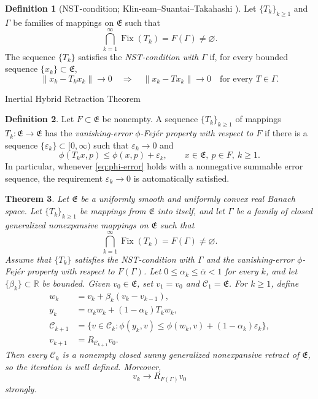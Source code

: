 \documentclass[leqno,12pt]{amsart}
\makeatletter
\def\R{\mathbb{R}}
\newtheorem{theorem}{Theorem}[section]
\theoremstyle{definition}
\newtheorem{definition}[theorem]{Definition}
\theoremstyle{remark}
\numberwithin{equation}{section}
\newcommand{\E}{\mathfrak{E}}
\newcommand{\C}{\mathscr{C}}
\newcommand{\Fix}{\operatorname{Fix}}
\def\section{\@startsection{section}{1}%
  \z@{.7\linespacing\@plus\linespacing}{.5\linespacing}%
  {\normalfont\bfseries\centering}}
\makeatother
\begin{document}
\begin{definition}[NST-condition; Klin-eam--Suantai--Takahashi \cite{KlineamSuantaiTakahashi2012}]\label{def:nst}
Let $\{T_k\}_{k\geq1}$ and $\Gamma$ be families of mappings on $\E$ such that
\[
 \bigcap_{k=1}^{\infty}\Fix(T_k)=F(\Gamma)\neq\varnothing.
\]
The sequence $\{T_k\}$ satisfies the \emph{NST-condition with $\Gamma$} if, for every bounded sequence $\{x_k\}\subset\E$,
\[
 \|x_k-T_kx_k\|\to0
 \quad\Longrightarrow\quad
 \|x_k-Tx_k\|\to0
 \quad\text{for every }T\in\Gamma.
\]
\end{definition}


\section{Inertial Hybrid Retraction Theorem}

\begin{definition}\label{def:phi-error}
Let $F\subset\E$ be nonempty. A sequence $\{T_k\}_{k\geq1}$ of mappings $T_k:\E\to\E$ has the \emph{vanishing-error $\phi$-Fej\'er property with respect to $F$} if there is a sequence $\{\varepsilon_k\}\subset[0,\infty)$ such that $\varepsilon_k\to0$ and
\begin{equation}\label{eq:phi-error}
 \phi(T_kx,p)\leq\phi(x,p)+\varepsilon_k,
 \qquad x\in\E,\ p\in F,\ k\geq1.
\end{equation}
In particular, whenever \eqref{eq:phi-error} holds with a nonnegative
summable error sequence, the requirement $\varepsilon_k\to0$ is automatically
satisfied.
\end{definition}

\begin{theorem}\label{thm:main}
Let $\E$ be a uniformly smooth and uniformly convex real Banach space. Let $\{T_k\}_{k\geq1}$ be mappings from $\E$ into itself, and let $\Gamma$ be a family of closed generalized nonexpansive mappings on $\E$ such that
\[
 \bigcap_{k=1}^{\infty}\Fix(T_k)=F(\Gamma)\neq\varnothing.
\]
Assume that $\{T_k\}$ satisfies the NST-condition with $\Gamma$ and the vanishing-error $\phi$-Fej\'er property with respect to $F(\Gamma)$. Let $0\leq\alpha_k\leq\overline\alpha<1$ for every $k$, and let $\{\beta_k\}\subset\R$ be bounded. Given $v_0\in\E$, set $v_1=v_0$ and $\C_1=\E$. For $k\geq1$, define
\begin{equation}\label{eq:main-algorithm}
\begin{aligned}
 w_k&=v_k+\beta_k(v_k-v_{k-1}),\\
 y_k&=\alpha_k w_k+(1-\alpha_k)T_kw_k,\\
 \C_{k+1}
 &=\bigl\{v\in\C_k:
 \phi(y_k,v)\leq\phi(w_k,v)+(1-\alpha_k)\varepsilon_k\bigr\},\\
 v_{k+1}&=R_{\C_{k+1}}v_0.
\end{aligned}
\end{equation}
Then every $\C_k$ is a nonempty closed sunny generalized nonexpansive retract of $\E$, so the iteration is well defined. Moreover,
\[
 v_k\longrightarrow R_{F(\Gamma)}v_0
\]
strongly.
\end{theorem}
\end{document}
